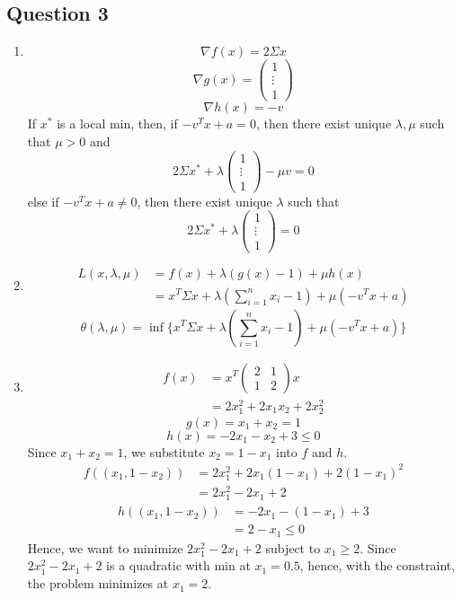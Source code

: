 \documentclass{article}
\newcommand{\vvv}[3]{\begin{pmatrix}#1\\#2\\#3\end{pmatrix}}
\begin{document}
\subsection*{Question 3}

\begin{enumerate}[label=(\roman*)]
\item
    \[\nabla f(x) = 2\Sigma x\]
    \[\nabla g(x) = \vvv{1}{\vdots}{1}\]
    \[\nabla h(x) = -v\]
    If $x^*$ is a local min, then, if $-v^Tx+a=0$, then there exist unique $\lambda,\mu$ such that $\mu>0$ and
    \[2\Sigma x^* + \lambda \vvv{1}{\vdots}{1} - \mu v = 0\]
    else if $-v^Tx+a \neq 0$, then there exist unique $\lambda$ such that
    \[2\Sigma x^* + \lambda \vvv{1}{\vdots}{1} = 0\]
\item
    \begin{align*}
    L(x,\lambda,\mu) &= f(x) + \lambda (g(x)-1) + \mu h(x) \\
        &= x^T \Sigma x + \lambda (\sum_{i=1}^n x_i-1) + \mu (-v^T x + a)
    \end{align*}
    \[
    \theta(\lambda,\mu) = \inf\{x^T \Sigma x + \lambda (\sum_{i=1}^n x_i - 1) + \mu (-v^T x + a)\}
    \]
\item
    \begin{align*}
    f(x) &= x^T \begin{pmatrix}
        2 & 1 \\ 1 & 2
        \end{pmatrix} x \\
        &= 2x_1^2 + 2x_1x_2 + 2x_2^2
    \end{align*}
    \[g(x) = x_1 + x_2 = 1\]
    \[h(x) = -2x_1 - x_2 + 3 \leq 0\]
    Since $x_1+x_2=1$, we substitute $x_2 = 1 - x_1$ into $f$ and $h$.
    \begin{align*}
    f((x_1,1-x_2)) &= 2x_1^2 + 2x_1(1-x_1) + 2(1-x_1)^2 \\
        &= 2x_1^2 - 2x_1 + 2
    \end{align*}
    \begin{align*}
    h((x_1,1-x_2)) &= -2x_1 - (1-x_1) + 3 \\
        &= 2 - x_1 \leq 0
    \end{align*}
    Hence, we want to minimize $2x_1^2 - 2x_1 + 2$ subject to $x_1 \geq 2$. Since $2x_1^2 - 2x_1 + 2$ is a quadratic with min at $x_1=0.5$, hence, with the constraint, the problem minimizes at $x_1 = 2$.
    

\end{enumerate}
\end{document}
